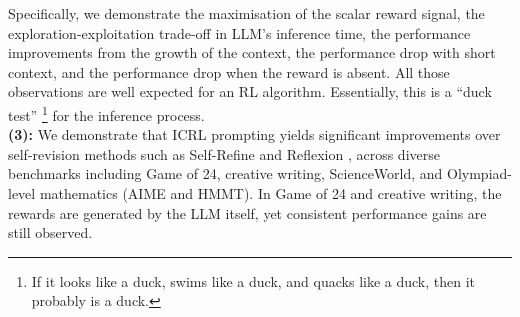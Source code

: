 \documentclass{article}
\newcommand{\0}{\mathbf{0}}
\begin{document}
  Specifically, we demonstrate the maximisation of the scalar reward signal,
  the exploration-exploitation trade-off in LLM's inference time,
  the performance improvements from the growth of the context,
  the performance drop with short context,
  and the performance drop when the reward is absent.
  All those observations are well expected for an RL algorithm.
  Essentially, this is a ``duck test'' \citep{heim2007exploringindiana}\footnote{If it looks like a duck, swims like a duck, and quacks like a duck, then it probably is a duck.} for the inference process. \\
\textbf{(3):}
We demonstrate that ICRL prompting yields significant improvements over self-revision methods such as Self-Refine \citep{self-refine} and Reflexion \citep{shinn2023reflexion}, across diverse benchmarks including Game of 24, creative writing, ScienceWorld, and Olympiad-level mathematics (AIME and HMMT). In Game of 24 and creative writing, the rewards are generated by the LLM itself, yet consistent performance gains are still observed.
\end{document}
